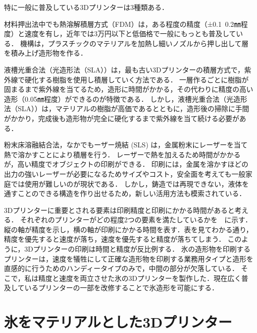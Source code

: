 特に一般に普及している3Dプリンターは3種類ある．

材料押出法中でも熱溶解積層方式（FDM）は，ある程度の精度（±0.1~0.2㎜程度）と速度を有し，近年では3万円以下と低価格で一般にもっとも普及している．
機構は，プラスチックのマテリアルを加熱し細いノズルから押し出して層を積み上げ造形物を作る．


液槽光重合法（光造形法（SLA））は，最も古い3Dプリンターの積層方式で，紫外線で硬化する樹脂を使用し積層していく方法である．
一層作るごとに樹脂が固まるまで紫外線を当てるため，造形に時間がかかる，その代わりに精度の高い造形（0.05㎜程度）ができるのが特徴である．
しかし，液槽光重合法（光造形法（SLA））は，マテリアルの樹脂が高価であるとともに，造形後の掃除に手間がかかり，完成後も造形物が完全に硬化するまで紫外線を当て続ける必要がある．


粉末床溶融結合法，なかでもーザー焼結 (SLS) は，金属粉末にレーザーを当て熱で溶かすことにより積層を行う．
レーザーで熱を加えるため時間がかかるが，高い精度でオブジェクトの印刷ができる．
印刷には，金属を溶かすほどの出力の強いレーザーが必要になるためサイズやコスト，安全面を考えても一般家庭では使用が難しいのが現状である．
しかし，鋳造では再現できない，液体を通すことのできる構造を作り出せるため，新しい活用方法も模索されている．



3Dプリンターに重要とされる要素は印刷精度と印刷にかかる時間があると考える．
それぞれのプリンターがどの程度2つの要素を満たしているかを　に示す．
縦の軸が精度を示し，横の軸が印刷にかかる時間を表す．表を見てわかる通り，精度を優先すると速度が落ち，速度を優先すると精度が落ちてしまう．
このように，3Dプリンターの印刷は時間と精度が反比例する．
氷の造形物を印刷するプリンターは，速度を犠牲にして正確な造形物を印刷する業務用タイプと造形を直感的に行うためのハンディータイプのみで，中間の部分が欠落している．
そこで，私は精度と速度を両立させた氷の3Dプリンターを製作した．現在広く普及しているプリンターの一部を改修することで氷造形を可能にする．

\section{氷をマテリアルとした3Dプリンター}
\label{sec:paragraph}

